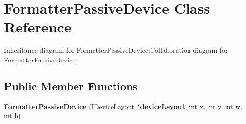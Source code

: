 \section{FormatterPassiveDevice Class Reference}
\label{classbr_1_1pucrio_1_1telemidia_1_1ginga_1_1ncl_1_1multidevice_1_1FormatterPassiveDevice}
Inheritance diagram for FormatterPassiveDevice:Collaboration diagram for FormatterPassiveDevice:\subsection*{Public Member Functions}
\begin{CompactItemize}
\item 
\textbf{FormatterPassiveDevice} (IDeviceLayout $\ast${\bf deviceLayout}, int x, int y, int w, int h)\label{classbr_1_1pucrio_1_1telemidia_1_1ginga_1_1ncl_1_1multidevice_1_1FormatterPassiveDevice_e0255e8882f3ef1213cdc40e95aaed27}

\end{CompactItemize}
